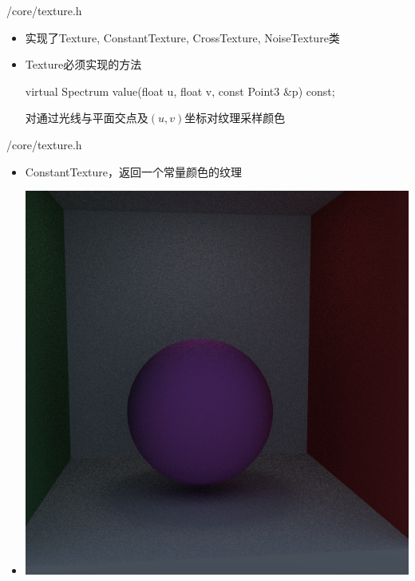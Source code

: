 \documentclass{beamer}
\begin{document}
\begin{frame} {/core/texture.h}
\begin{itemize}
\item 实现了Texture, ConstantTexture, CrossTexture, NoiseTexture类
\item Texture必须实现的方法
\begin{semiverbatim} virtual Spectrum value(float u, float v, const Point3 \&p) const; \end{semiverbatim}
对通过光线与平面交点及$(u, v)$坐标对纹理采样颜色
\end{itemize}
\end{frame}

\begin{frame} {/core/texture.h}
\begin{itemize}
\item ConstantTexture，返回一个常量颜色的纹理
\item \includegraphics[scale=0.2]{constant}
\end{itemize}
\end{frame}
\end{document}
